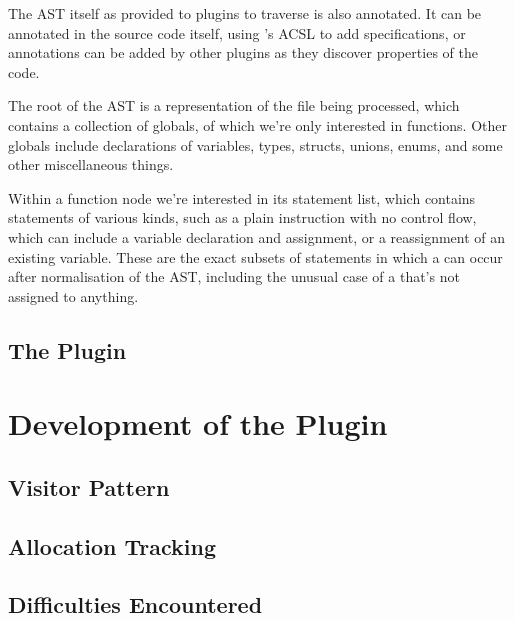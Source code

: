 The AST itself as provided to plugins to traverse is also annotated. It can be annotated in the source code itself, using 's ACSL to add specifications, or annotations can be added by other plugins as they discover properties of the code.

The root of the AST is a representation of the file being processed, which contains a collection of globals, of which we're only interested in functions. Other globals include declarations of variables, types, structs, unions, enums, and some other miscellaneous things.

Within a function node we're interested in its statement list, which contains statements of various kinds, such as a plain instruction with no control flow, which can include a variable declaration and assignment, or a reassignment of an existing variable. These are the exact subsets of statements in which a \malloc{} can occur after normalisation of the AST, including the unusual case of a \malloc{} that's not assigned to anything.

\subsection{The  Plugin}


\section{Development of the  Plugin}

\subsection{Visitor Pattern}


\subsection{Allocation Tracking}


\subsection{Difficulties Encountered}

